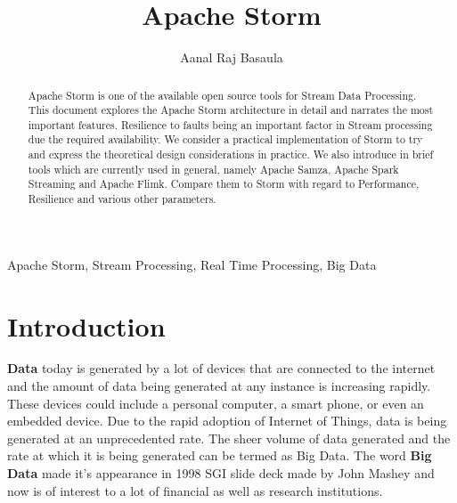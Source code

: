 \documentclass[runningheads,a4paper]{llncs}[2015/06/24]
\begin{document}
\title{Apache Storm}

\author{Aanal Raj Basaula}






\frontpageen %

\thispagestyle{empty}
\cleardoublepage

\maketitle

\begin{abstract}
Apache Storm is one of the available open source tools for Stream Data Processing. This document explores the Apache Storm architecture in detail and narrates the most important features. Resilience to faults being an important factor in Stream processing due the required availability. We consider a practical implementation of Storm to try and express the theoretical design considerations in practice. We also introduce in brief tools which are currently used in general, namely Apache Samza, Apache Spark Streaming and Apache Flimk. Compare them to Storm with regard to Performance, Resilience and various other parameters.
\end{abstract}

\begin{keywords}
Apache Storm, Stream Processing, Real Time Processing, Big Data
\end{keywords}

\section{Introduction}

\textbf{Data} today is generated by a lot of devices that are connected to the internet and the amount of data being generated at any instance is increasing rapidly. These devices could include a personal computer, a smart phone, or even an embedded device. Due to the rapid adoption of Internet of Things, data is being generated at an unprecedented rate. The sheer volume of data generated and the rate at which it is being generated can be termed as Big Data. The word \textbf{Big Data} made it's appearance in 1998 SGI slide deck made by John Mashey and now is of interest to a lot of financial as well as research institutions.\cite{miningstatus}
\end{document}
